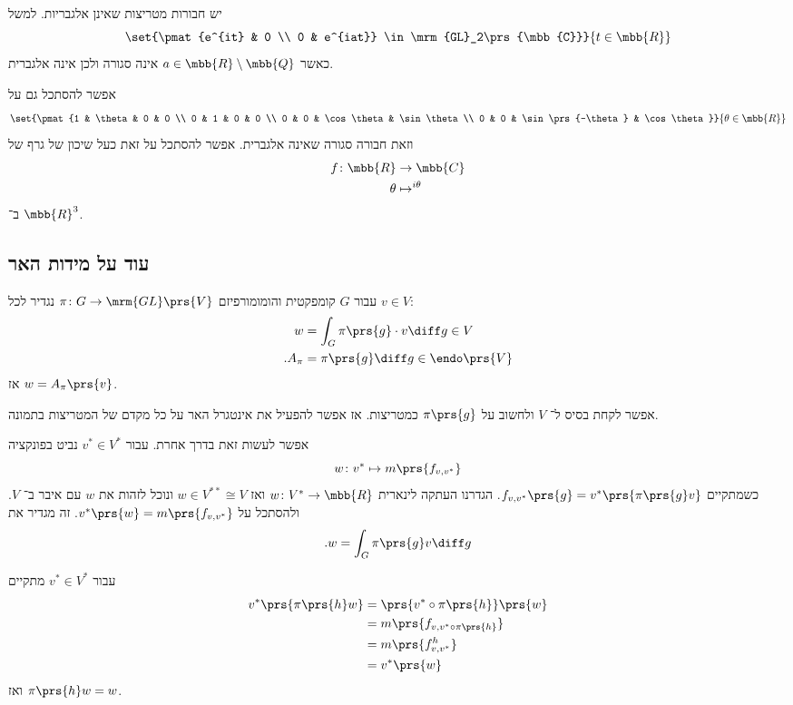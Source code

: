 \documentclass[10pt, twoside]{book}
\begin{document}
\begin{remark}
יש חבורות מטריצות שאינן אלגבריות.
למשל
\[\set{\pmat{e^{it} & 0 \\ 0 & e^{iat}} \in \mrm{GL}_2\prs{\mbb{C}}}{t \in \mbb{R}}\]
כאשר
$a \in \mbb{R} \setminus \mbb{Q}$
אינה סגורה ולכן אינה אלגברית.

אפשר להסתכל גם על
\[\set{\pmat{1 & \theta & 0 & 0 \\ 0 & 1 & 0 & 0 \\ 0 & 0 & \cos \theta & \sin \theta \\ 0 & 0 & \sin \prs{-\theta} & \cos \theta}}{\theta \in \mbb{R}}\]
וזאת חבורה סגורה שאינה אלגברית.
אפשר להסתכל על זאת כעל שיכון של גרף של
\begin{align*}
f \colon \mbb{R} &\to \mbb{C} \\
\theta &\mapsto^{i\theta}
\end{align*}
ב־%
$\mbb{R}^3$.
\end{remark}

\subsection{עוד על מידות האר}

עבור
$G$
קומפקטית והומומורפיזם
$\pi \colon G \to \mrm{GL}\prs{V}$
נגדיר לכל
$v \in V$:
\begin{align*}
w &= \int_G \pi\prs{g} \cdot v \diff g \in V \\
\text{.}A_\pi &= \pi\prs{g} \diff g \in \endo\prs{V}
\end{align*}
אז
$w = A_\pi\prs{v}$.

אפשר לקחת בסיס ל־%
$V$
ולחשוב על
$\pi\prs{g}$
כמטריצות. אז אפשר להפעיל את אינטגרל האר על כל מקדם של המטריצות בתמונה.


אפשר לעשות זאת בדרך אחרת.
עבור
$v^* \in V^*$
נביט בפונקציה
\[w \colon v^* \mapsto m\prs{f_{v,v^*}}\]
כשמתקיים
$f_{v,v^*}\prs{g} = v^*\prs{\pi\prs{g} v}$.
הגדרנו העתקה לינארית
$w \colon V^* \to \mbb{R}$
ואז
$w \in V^{**} \cong V$
ונוכל לזהות את
$w$
עם איבר ב־%
$V$.
ולהסתכל על
$v^*\prs{w} = m\prs{f_{v,v^*}}$.
זה מגדיר את
\[\text{.} w = \int_G \pi\prs{g} v \diff g\]

עבור
$v^* \in V^*$
מתקיים
\begin{align*}
v^*\prs{\pi\prs{h} w} &= \prs{v^* \circ \pi\prs{h}}\prs{w}
\\&= m\prs{f_{v,v^* \circ \pi\prs{h}}}
\\&= m\prs{f_{v,v^*}^h}
\\&= v^*\prs{w}
\end{align*}
ואז
$\pi\prs{h}w = w$.
\end{document}
